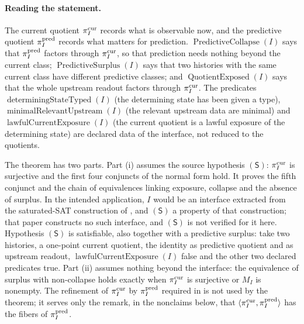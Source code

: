 \paragraph{Reading the statement.}
The current quotient \(\pi^{\mathrm{cur}}_I\) records what is observable now, and
the predictive quotient \(\pi^{\mathrm{pred}}_I\) records what matters for
prediction.  \(\operatorname{PredictiveCollapse}(I)\) says that
\(\pi^{\mathrm{pred}}_I\) factors through \(\pi^{\mathrm{cur}}_I\), so that prediction needs
nothing beyond the current class; \(\operatorname{PredictiveSurplus}(I)\)
says that two histories with the same current class have different
predictive classes; and \(\operatorname{QuotientExposed}(I)\) says that
the whole upstream readout factors through \(\pi^{\mathrm{cur}}_I\).  The predicates
\(\operatorname{determiningStateTyped}(I)\) (the determining state has
been given a type), \(\operatorname{minimalRelevantUpstream}(I)\) (the
relevant upstream data are minimal) and
\(\operatorname{lawfulCurrentExposure}(I)\) (the current quotient is a
lawful exposure of the determining state) are declared data of the
interface, not reduced to the quotients.

The theorem has two parts.  Part (i) assumes the source hypothesis
\((\mathsf S)\): \(\pi^{\mathrm{cur}}_I\) is surjective and the first four conjuncts
of the normal form hold.  It proves the fifth conjunct and the chain of
equivalences linking exposure, collapse and the absence of surplus.  In
the intended application, \(I\) would be an interface extracted from
the saturated-SAT construction of \citet{Tsiokos2026PvNP}, and
\((\mathsf S)\) a property of that construction; that paper constructs
no such interface, and \((\mathsf S)\) is not verified for it here.
Hypothesis \((\mathsf S)\) is satisfiable, also together with a
predictive surplus: take two histories, a one-point current quotient,
the identity as predictive quotient and as upstream readout,
\(\operatorname{lawfulCurrentExposure}(I)\) false and the other two
declared predicates true.  Part (ii) assumes nothing beyond the
interface: the equivalence of surplus with non-collapse holds exactly
when \(\pi^{\mathrm{cur}}_I\) is surjective or \(M_I\) is nonempty.  The refinement
of \(\pi^{\mathrm{cur}}_I\) by \(\pi^{\mathrm{pred}}_I\) required in
 is not used by the theorem; it serves
only the remark, in the nonclaims below, that
\(\langle\pi^{\mathrm{cur}}_I,\pi^{\mathrm{pred}}_I\rangle\) has the fibers of \(\pi^{\mathrm{pred}}_I\).

